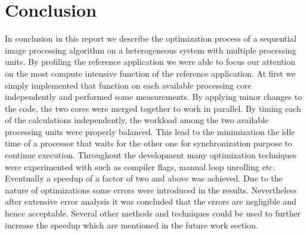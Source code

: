 \section{Conclusion}
\label{sec:Conclusion}
In conclusion in this report we describe the optimization process of a sequential image processing algorithm on a heterogeneous system with multiple processing units.
By profiling the reference application we were able to focus our attention on the most compute intensive function of the reference application.
At first we simply implemented that function on each available processing core independently and performed some measurements. By applying minor changes to the code, the two cores were merged together to work in parallel.
By timing each of the calculations independently, the workload among the two available processing units were properly balanced.
This lead to the minimization the idle time of a processor that waits for the other one for synchronization purpose to continue execution.
Throughout the development many optimization techniques were experimented with such as compiler flags, manual loop unrolling etc.
Eventually a speedup of a factor of two and above was achieved. Due to the nature of optimizations some errors were introduced in the results. Nevertheless after extensive error analysis it was concluded that the errors are negligible and hence acceptable. Several other methods and techniques could be used to further increase the speedup which are mentioned in the future work section.